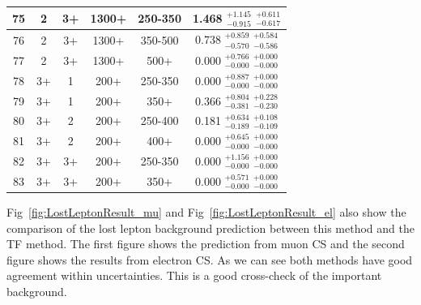 \begin{table}[htbp]
\begin{centering}
\begin{tabular}{|c|c|c|c|c||c|}
\hline
75 &               2 &              3+ &           1300+ &         250-350 & 1.468 $^{+1.145}_{-0.915}$ $^{+0.611}_{-0.617}$ \\ 
\hline
76 &               2 &              3+ &           1300+ &         350-500 & 0.738 $^{+0.859}_{-0.570}$ $^{+0.584}_{-0.586}$ \\ 
\hline
77 &               2 &              3+ &           1300+ &            500+ & 0.000 $^{+0.766}_{-0.000}$ $^{+0.000}_{-0.000}$ \\ 
\hline
78 &              3+ &               1 &            200+ &         250-350 & 0.000 $^{+0.887}_{-0.000}$ $^{+0.000}_{-0.000}$ \\ 
\hline
79 &              3+ &               1 &            200+ &            350+ & 0.366 $^{+0.804}_{-0.381}$ $^{+0.228}_{-0.230}$ \\ 
\hline
80 &              3+ &               2 &            200+ &         250-400 & 0.181 $^{+0.634}_{-0.189}$ $^{+0.108}_{-0.109}$ \\ 
\hline
81 &              3+ &               2 &            200+ &            400+ & 0.000 $^{+0.645}_{-0.000}$ $^{+0.000}_{-0.000}$ \\ 
\hline
82 &              3+ &              3+ &            200+ &         250-350 & 0.000 $^{+1.156}_{-0.000}$ $^{+0.000}_{-0.000}$ \\ 
\hline
83 &              3+ &              3+ &            200+ &            350+ & 0.000 $^{+0.571}_{-0.000}$ $^{+0.000}_{-0.000}$ \\ 
\hline
\end{tabular}
\par\end{centering}
\end{table}

Fig~\ref{fig:LostLeptonResult_mu} and Fig~\ref{fig:LostLeptonResult_el} also show the comparison of the lost lepton background prediction between this method and the TF method. The first figure shows the prediction from muon CS and the second figure shows the results from electron CS. As we can see both methods have good agreement within uncertainties. This is a good cross-check of the important background.
